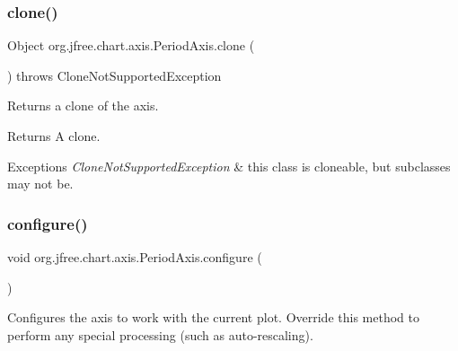 \subsubsection{\texorpdfstring{clone()}{clone()}}
{\footnotesize\ttfamily Object org.\+jfree.\+chart.\+axis.\+Period\+Axis.\+clone (\begin{DoxyParamCaption}{ }\end{DoxyParamCaption}) throws Clone\+Not\+Supported\+Exception}

Returns a clone of the axis.

\begin{DoxyReturn}{Returns}
A clone.
\end{DoxyReturn}

\begin{DoxyExceptions}{Exceptions}
{\em Clone\+Not\+Supported\+Exception} & this class is cloneable, but subclasses may not be. \\
\hline
\end{DoxyExceptions}
\mbox{\label{classorg_1_1jfree_1_1chart_1_1axis_1_1_period_axis_af49bf2315554aa56607fc4cb2e00997f}} 
\subsubsection{\texorpdfstring{configure()}{configure()}}
{\footnotesize\ttfamily void org.\+jfree.\+chart.\+axis.\+Period\+Axis.\+configure (\begin{DoxyParamCaption}{ }\end{DoxyParamCaption})}

Configures the axis to work with the current plot. Override this method to perform any special processing (such as auto-\/rescaling). \mbox{\label{classorg_1_1jfree_1_1chart_1_1axis_1_1_period_axis_af2ce1b30092e709bd3f2f2550bdd947b}} 
